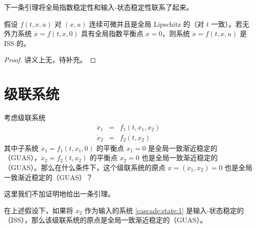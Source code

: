 下一条引理将全局指数稳定性和输入-状态稳定性联系了起来。

\begin{lemma}\label{ISS_lemma}
    假设 $f(t, x, u)$ 对 $(x, u)$ 连续可微并且是全局 Lipschitz 的（对 $t$ 一致）。若无外力系统 $\dot{x} = f (t, x, 0)$ 具有全局指数平衡点 $x = 0$，则系统 $\dot{x} = f (t, x, u)$ 是 ISS 的。
\end{lemma}

\begin{proof}
    讲义上无，待补充。%
\end{proof}


\section*{级联系统}

考虑级联系统
\begin{eqnarray}
    \dot{x}_1 & = & f_1 (t, x_1, x_2)  \label{cascade:state:1}\\
    \dot{x}_2 & = & f_2 (t, x_2)  \label{cascade:state:2}
\end{eqnarray}
其中子系统 $\dot{x}_1 = f_1 (t, x_1, 0)$ 的平衡点 $x_1 = 0$ 是全局一致渐近稳定的（GUAS），$\dot{x}_2 = f_2(t, x_2)$ 的平衡点 $x_2 = 0$ 也是全局一致渐近稳定的（GUAS）。那么在什么条件下，这个级联系统的原点 $x = (x_1, x_2) = 0$ 也是全局一致渐近稳定的（GUAS）？

这里我们不加证明地给出一条引理。
\begin{lemma}
    在上述假设下，如果将 $x_2$ 作为输入的系统 \eqref{cascade:state:1} 是输入-状态稳定的（ISS），那么该级联系统的原点是全局一致渐近稳定的（GUAS）。
\end{lemma}
